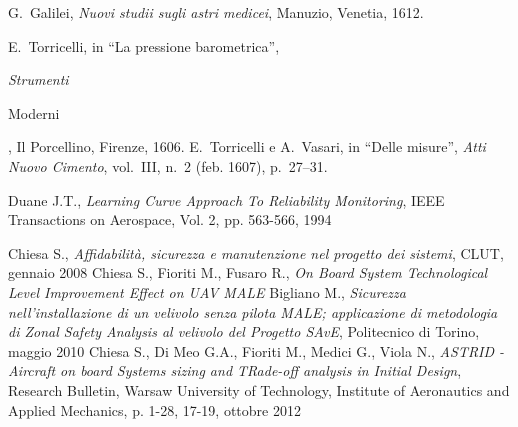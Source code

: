 \begin{thebibliography}{9}

     G.~Galilei, {\em Nuovi studii sugli astri medicei}, Manuzio, Venetia, 1612.

     E.~Torricelli, in ``La pressione barometrica'', {\em Strumenti

            Moderni}, Il Porcellino, Firenze, 1606.
     E.~Torricelli e A.~Vasari, in ``Delle misure'', {\em Atti Nuovo
            Cimento}, vol.~III, n.~2 (feb. 1607), p.~27--31.

     Duane J.T., \emph{Learning Curve Approach To Reliability Monitoring}, IEEE Transactions on Aerospace, Vol. 2, pp. 563-566, 1994


     Chiesa S., \emph{Affidabilità, sicurezza e manutenzione
        nel progetto dei sistemi}, CLUT, gennaio 2008
    Chiesa S., Fioriti M., Fusaro R., \emph{On Board System
        Technological  Level Improvement Effect on UAV MALE}
     Bigliano M., \emph{Sicurezza nell'installazione di un velivolo
        senza pilota MALE; applicazione di metodologia di Zonal Safety
        Analysis al velivolo del Progetto SAvE}, Politecnico di Torino,
    maggio 2010
     Chiesa S., Di Meo G.A., Fioriti M., Medici G., Viola N.,
    \emph{ASTRID - Aircraft on board Systems sizing and TRade-off
        analysis in Initial Design}, Research Bulletin, Warsaw University
    of Technology, Institute of Aeronautics and Applied Mechanics,
    p. 1-28, 17-19, ottobre 2012

\end{thebibliography}
